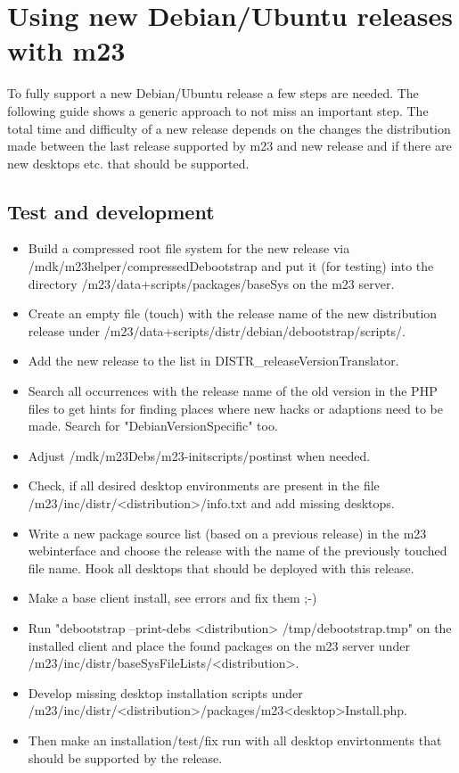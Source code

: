 \section{Using new Debian/Ubuntu releases with m23}
To fully support a new Debian/Ubuntu release a few steps are needed. The following guide shows a generic approach to not miss an important step. The total time and difficulty of a new release depends on the changes the distribution made between the last release supported by m23 and new release and if there are new desktops etc. that should be supported.

\subsection{Test and development}
\begin{itemize}
\item Build a compressed root file system for the new release via /mdk/m23helper/compressedDebootstrap and put it (for testing) into the directory /m23/data+scripts/packages/baseSys on the m23 server.

\item Create an empty file (touch) with the release name of the new distribution release under /m23/data+scripts/distr/debian/debootstrap/scripts/.

\item Add the new release to the list in DISTR_releaseVersionTranslator.

\item Search all occurrences with the release name of the old version in the PHP files to get hints for finding places where new hacks or adaptions need to be made. Search for "DebianVersionSpecific" too.

\item Adjust /mdk/m23Debs/m23-initscripts/postinst when needed.

\item Check, if all desired desktop environments are present in the file /m23/inc/distr/<distribution>/info.txt and add missing desktops.

\item Write a new package source list (based on a previous release) in the m23 webinterface and choose the release with the name of the previously touched file name. Hook all desktops that should be deployed with this release.

\item Make a base client install, see errors and fix them ;-)

\item Run "debootstrap --print-debs <distribution> /tmp/debootstrap.tmp" on the installed client and place the found packages on the m23 server under /m23/inc/distr/baseSysFileLists/<distribution>.

\item Develop missing desktop installation scripts under /m23/inc/distr/<distribution>/packages/m23<desktop>Install.php.

\item Then make an installation/test/fix run with all desktop envirtonments that should be supported by the release.
\end{itemize}



